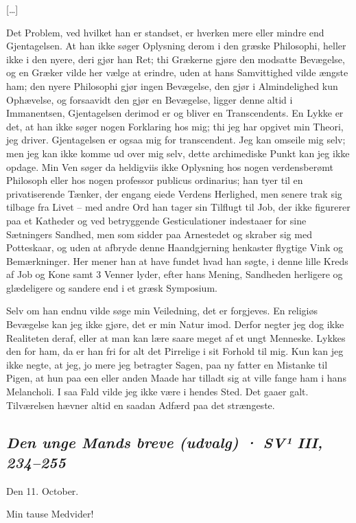 \documentclass[12pt,a4paper]{article}
\newcommand{\sectionheading}[1]{\subsection*{\normalfont\itshape #1}}
\begin{document}
[…]

Det Problem, ved hvilket han er standset, er hverken mere eller mindre end Gjentagelsen. At han ikke søger Oplysning derom i den græske Philosophi, heller ikke i den nyere, deri gjør han Ret; thi Grækerne gjøre den modsatte Bevægelse, og en Græker vilde her vælge at erindre, uden at hans Samvittighed vilde ængste ham; den nyere Philosophi gjør ingen Bevægelse, den gjør i Almindelighed kun Ophævelse, og forsaavidt den gjør en Bevægelse, ligger denne altid i Immanentsen, Gjentagelsen derimod er og bliver en Transcendents. En Lykke er det, at han ikke søger nogen Forklaring hos mig; thi jeg har opgivet min Theori, jeg driver. Gjentagelsen er ogsaa mig for transcendent. Jeg kan omseile mig selv; men jeg kan ikke komme ud over mig selv, dette archimediske Punkt kan jeg ikke opdage. Min Ven søger da heldigviis ikke Oplysning hos nogen verdensberømt Philosoph eller hos nogen professor publicus ordinarius; han tyer til en privatiserende Tænker, der engang eiede Verdens Herlighed, men senere trak sig tilbage fra Livet – med andre Ord han tager sin Tilflugt til Job, der ikke figurerer paa et Katheder og ved betryggende Gesticulationer indestaaer for sine Sætningers Sandhed, men som sidder paa Arnestedet og skraber sig med Potteskaar, og uden at afbryde denne Haandgjerning henkaster flygtige Vink og Bemærkninger. Her mener han at have fundet hvad han søgte, i denne lille Kreds af Job og Kone samt 3 Venner lyder, efter hans Mening, Sandheden herligere og glædeligere og sandere end i et græsk Symposium.

Selv om han endnu vilde søge min Veiledning, det er forgjeves. En religiøs Bevægelse kan jeg ikke gjøre, det er min Natur imod. Derfor negter jeg dog ikke Realiteten deraf, eller at man kan lære saare meget af et ungt Menneske. Lykkes den for ham, da er han fri for alt det Pirrelige i sit Forhold til mig. Kun kan jeg ikke negte, at jeg, jo mere jeg betragter Sagen, paa ny fatter en Mistanke til Pigen, at hun paa een eller anden Maade har tilladt sig at ville fange ham i hans Melancholi. I saa Fald vilde jeg ikke være i hendes Sted. Det gaaer galt. Tilværelsen hævner altid en saadan Adfærd paa det strængeste.

\sectionheading{Den unge Mands breve (udvalg)  ·  SV¹ III, 234–255}

Den 11. October.

Min tause Medvider!
\end{document}
